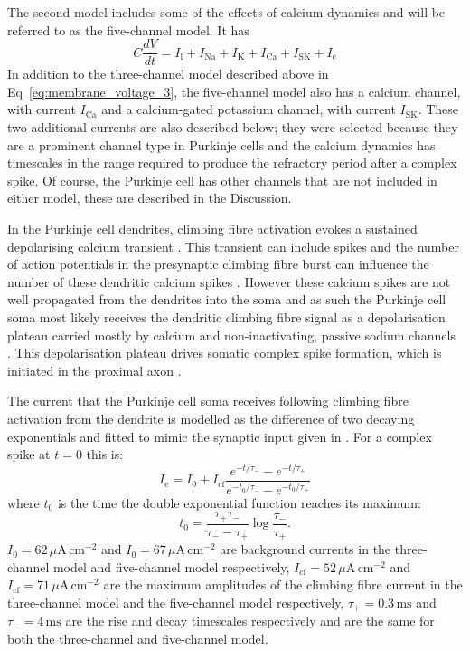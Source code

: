 \documentclass[utf8]{frontiersSCNS} %
\newcommand{\mse}{\,\mathrm{ms}}
\newcommand{\cm}{\,\mathrm{cm}}
\renewcommand{\k}{\mathrm{K}}
\newcommand{\ca}{\mathrm{Ca}}
\newcommand{\na}{\mathrm{Na}}
\newcommand{\sk}{\mathrm{SK}}
\newcommand{\leak}{\mathrm{l}}
\begin{document}
The second model includes some of the effects of calcium dynamics and
will be referred to as the five-channel model. It has
\begin{equation}
\label{eq:membrane_voltage_5}
C\frac{dV}{dt} =I_{\leak}+I_{\na}+I_\k+I_\ca+I_\sk+I_{\mathrm{e}}
\end{equation}
In addition to the three-channel model described above in
Eq~\ref{eq:membrane_voltage_3}, the five-channel model also has a
calcium channel, with current $I_\ca$ and a calcium-gated potassium
channel, with current $I_\sk$. These two additional currents are also
described below; they were selected because they are a prominent
channel type in Purkinje cells and the calcium dynamics has timescales
in the range required to produce the refractory period after a complex
spike. Of course, the Purkinje cell has other channels that are not
included in either model, these are described in the Discussion.

In the Purkinje cell dendrites, climbing fibre activation evokes a
sustained depolarising calcium transient
\cite{KitamuraHaeusser2011}. This transient can include spikes and the
number of action potentials in the presynaptic climbing fibre burst can influence
the number of these dendritic calcium spikes
\cite{LlinasSugimori1980a,KitamuraHaeusser2011,DavieEtAl2008,MathyEtAl2009}. However
these calcium spikes are not well propagated from the dendrites into
the soma \cite{DavieEtAl2008} and as such the Purkinje cell soma most
likely receives the dendritic climbing fibre signal as a
depolarisation plateau carried mostly by calcium and non-inactivating, passive sodium
channels
\cite{LlinasSugimori1980b,KnopfelEtAl1990,LlinasNicholson1971,StuartHausser1994}. This
depolarisation plateau drives somatic complex spike formation, which
is initiated in the proximal axon \cite{StuartHausser1994,DavieEtAl2008,PalmerEtAl2010}. 

The current that the Purkinje cell soma receives following climbing
fibre activation from the dendrite is modelled as the difference of
two decaying exponentials and fitted to mimic the synaptic input given in \cite{DavieEtAl2008}. For a complex spike at $t=0$ this is:
\begin{equation}
\label{eq:I_synapse}
I_{\mathrm{e}} = I_0+I_{\mathrm{cf}}\frac{e^{-t/\tau_-}-e^{-t/\tau_+}}{e^{-t_0/\tau_-}-e^{-t_0/\tau_+}}
\end{equation}
where $t_0$ is the time the double exponential function reaches its maximum:
\begin{equation}
t_0 = \frac{\tau_+\tau_-} {\tau_--\tau_+}\log{\frac{\tau_-}{\tau_+}}.
\end{equation}
$I_0=62\,\mu\mathrm{A}\cm^{-2}$ and $I_0=67\,\mu\mathrm{A}\cm^{-2}$ are background currents in the three-channel model and five-channel model respectively,
$I_{\mathrm{cf}}=52\,\mu\mathrm{A}\cm^{-2}$ and $I_{\mathrm{cf}}=71\,\mu\mathrm{A}\cm^{-2}$ are the maximum amplitudes of the climbing fibre current in the three-channel model and the five-channel model respectively, $\tau_+=0.3\mse$ and $\tau_-=4\mse$ are the rise and decay timescales respectively and are the same for both the three-channel and five-channel model.
\end{document}
